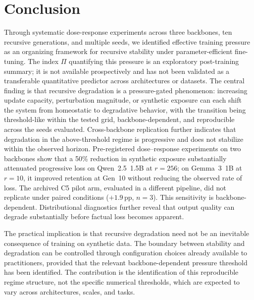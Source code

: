 \documentclass[a4paper,fleqn]{cas-dc}
\newif\ifshowchanges
\newcommand{\rev}[1]{\ifshowchanges{\color{blue}#1}\else{#1}\fi}
\begin{document}
\FloatBarrier
\section{Conclusion}\label{sec:conclusion}

Through systematic dose-response experiments across three backbones, ten
recursive generations, and multiple seeds, we identified effective training
pressure as an organizing framework for recursive stability under
parameter-efficient fine-tuning. \rev{The index $\Pi$ quantifying this pressure is an
exploratory post-training summary; it is not available prospectively and has
not been validated as a transferable quantitative predictor across
architectures or datasets.} The central finding is that recursive
degradation is a pressure-gated phenomenon: increasing update capacity,
perturbation magnitude, or synthetic exposure \rev{can each shift} the system from homeostatic to degradative behavior, with the transition being
\rev{threshold-like within the tested grid}, backbone-dependent, and reproducible across the seeds evaluated. Cross-backbone replication \rev{further indicates} that degradation in the above-threshold regime is progressive and does not
stabilize within the observed horizon. \rev{Pre-registered dose--response
experiments on two backbones show that a 50\% reduction in synthetic exposure
\rev{substantially} attenuated progressive loss on \rev{Qwen~2.5~1.5B at $r=256$}; on \rev{Gemma~3~1B at $r=10$}, it improved
retention at Gen~10 without reducing the observed rate of loss. The archived C5 pilot arm, evaluated in a
different pipeline, did not replicate under paired conditions ($+1.9$\,pp,
$n=3$).} This sensitivity is backbone-dependent. Distributional diagnostics further reveal
that output quality can degrade substantially before factual loss becomes
apparent.

The practical implication is that recursive degradation need not be an
inevitable consequence of training on synthetic data. The boundary between
stability and degradation can be controlled through configuration choices
already available to practitioners, provided that the relevant
backbone-dependent pressure threshold has been identified. The contribution is
the identification of this reproducible regime structure, not the specific
numerical thresholds, which are expected to vary across architectures, scales,
and tasks.
\end{document}
